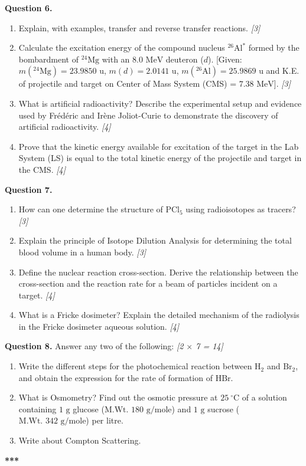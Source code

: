 \documentclass[11pt,a4paper]{article}
\newcommand{\pts}[1]{\hfill \textit{[#1]}}
\begin{document}
\bigskip

\noindent \textbf{Question 6.}
\begin{enumerate}[label=(\alph*)]
  \item Explain, with examples, transfer and reverse transfer reactions. \pts{3}
  \item Calculate the excitation energy of the compound nucleus $^{26}\text{Al}^*$ formed by the bombardment of $^{24}\text{Mg}$ with an $8.0\text{ MeV}$ deuteron ($d$). [Given: $m(^{24}\text{Mg}) = 23.9850\text{ u}$, $m(d) = 2.0141\text{ u}$, $m(^{26}\text{Al}) = 25.9869\text{ u}$ and K.E. of projectile and target on Center of Mass System (CMS) = $7.38\text{ MeV}$]. \pts{3}
  \item What is artificial radioactivity? Describe the experimental setup and evidence used by Frédéric and Irène Joliot-Curie to demonstrate the discovery of artificial radioactivity. \pts{4}
  \item Prove that the kinetic energy available for excitation of the target in the Lab System (LS) is equal to the total kinetic energy of the projectile and target in the CMS. \pts{4}
\end{enumerate}

\bigskip

\noindent \textbf{Question 7.}
\begin{enumerate}[label=(\alph*)]
  \item How can one determine the structure of $\text{PCl}_5$ using radioisotopes as tracers? \pts{3}
  \item Explain the principle of Isotope Dilution Analysis for determining the total blood volume in a human body. \pts{3}
  \item Define the nuclear reaction cross-section. Derive the relationship between the cross-section and the reaction rate for a beam of particles incident on a target. \pts{4}
  \item What is a Fricke dosimeter? Explain the detailed mechanism of the radiolysis in the Fricke dosimeter aqueous solution. \pts{4}
\end{enumerate}

\bigskip

\noindent \textbf{Question 8.} Answer any two of the following: \pts{2 $\times$ 7 = 14}
\begin{enumerate}[label=(\alph*)]
  \item Write the different steps for the photochemical reaction between $\text{H}_2$ and $\text{Br}_2$, and obtain the expression for the rate of formation of $\text{HBr}$.
  \item What is Osmometry? Find out the osmotic pressure at $25\ ^\circ\text{C}$ of a solution containing $1\text{ g}$ glucose ($\text{M.Wt. } 180\text{ g/mole}$) and $1\text{ g}$ sucrose ($\text{M.Wt. } 342\text{ g/mole}$) per litre.
  \item Write about Compton Scattering.
\end{enumerate}

\bigskip
\begin{center}
  \textbf{***}
\end{center}
\end{document}
